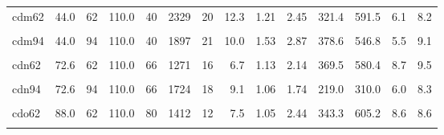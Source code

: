 \begin{landscape}
\begin{longtable}[t]{lrrrrrrrrrrrrr}
cdm62 & 44.0 & 62 & 110.0 & 40 & 2329 & 20 & 12.3 & 1.21 & 2.45 & 321.4 & 591.5 & 6.1 & 8.2\\
\cellcolor{gray!6}{cdm78} & \cellcolor{gray!6}{44.0} & \cellcolor{gray!6}{78} & \cellcolor{gray!6}{110.0} & \cellcolor{gray!6}{40} & \cellcolor{gray!6}{1833} & \cellcolor{gray!6}{18} & \cellcolor{gray!6}{9.7} & \cellcolor{gray!6}{1.48} & \cellcolor{gray!6}{2.51} & \cellcolor{gray!6}{375.1} & \cellcolor{gray!6}{637.6} & \cellcolor{gray!6}{6.4} & \cellcolor{gray!6}{7.7}\\
cdm94 & 44.0 & 94 & 110.0 & 40 & 1897 & 21 & 10.0 & 1.53 & 2.87 & 378.6 & 546.8 & 5.5 & 9.1\\
\cellcolor{gray!6}{cdn46} & \cellcolor{gray!6}{72.6} & \cellcolor{gray!6}{46} & \cellcolor{gray!6}{110.0} & \cellcolor{gray!6}{66} & \cellcolor{gray!6}{2020} & \cellcolor{gray!6}{51} & \cellcolor{gray!6}{10.7} & \cellcolor{gray!6}{1.25} & \cellcolor{gray!6}{2.35} & \cellcolor{gray!6}{404.7} & \cellcolor{gray!6}{691.1} & \cellcolor{gray!6}{10.1} & \cellcolor{gray!6}{14.2}\\
cdn62 & 72.6 & 62 & 110.0 & 66 & 1271 & 16 & 6.7 & 1.13 & 2.14 & 369.5 & 580.4 & 8.7 & 9.5\\
\cellcolor{gray!6}{cdn78} & \cellcolor{gray!6}{72.6} & \cellcolor{gray!6}{78} & \cellcolor{gray!6}{110.0} & \cellcolor{gray!6}{66} & \cellcolor{gray!6}{1704} & \cellcolor{gray!6}{19} & \cellcolor{gray!6}{9.0} & \cellcolor{gray!6}{1.38} & \cellcolor{gray!6}{1.49} & \cellcolor{gray!6}{294.5} & \cellcolor{gray!6}{304.7} & \cellcolor{gray!6}{7.2} & \cellcolor{gray!6}{8.5}\\
cdn94 & 72.6 & 94 & 110.0 & 66 & 1724 & 18 & 9.1 & 1.06 & 1.74 & 219.0 & 310.0 & 6.0 & 8.3\\
\cellcolor{gray!6}{cdo46} & \cellcolor{gray!6}{88.0} & \cellcolor{gray!6}{46} & \cellcolor{gray!6}{110.0} & \cellcolor{gray!6}{80} & \cellcolor{gray!6}{1468} & \cellcolor{gray!6}{44} & \cellcolor{gray!6}{7.8} & \cellcolor{gray!6}{1.20} & \cellcolor{gray!6}{1.74} & \cellcolor{gray!6}{381.5} & \cellcolor{gray!6}{381.5} & \cellcolor{gray!6}{8.6} & \cellcolor{gray!6}{8.6}\\
cdo62 & 88.0 & 62 & 110.0 & 80 & 1412 & 12 & 7.5 & 1.05 & 2.44 & 343.3 & 605.2 & 8.6 & 8.6\\
\cellcolor{gray!6}{cdo78} & \cellcolor{gray!6}{88.0} & \cellcolor{gray!6}{78} & \cellcolor{gray!6}{110.0} & \cellcolor{gray!6}{80} & \cellcolor{gray!6}{1709} & \cellcolor{gray!6}{15} & \cellcolor{gray!6}{9.0} & \cellcolor{gray!6}{0.92} & \cellcolor{gray!6}{1.38} & \cellcolor{gray!6}{291.0} & \cellcolor{gray!6}{291.0} & \cellcolor{gray!6}{6.4} & \cellcolor{gray!6}{9.6}\\

\end{longtable}
\end{landscape}
